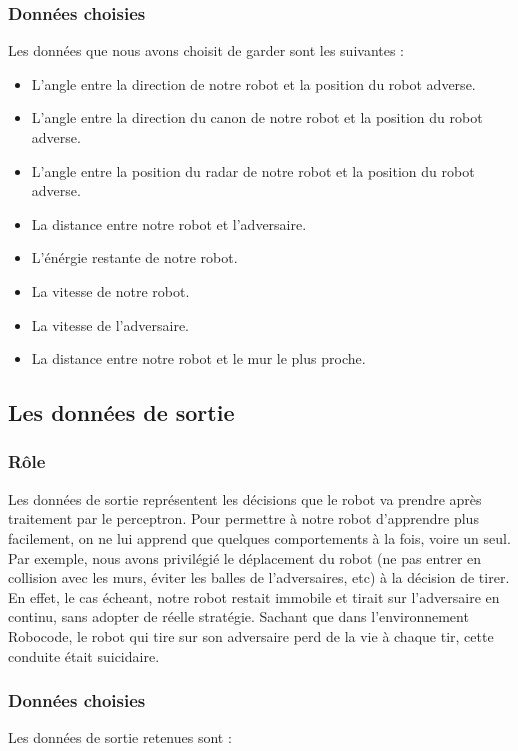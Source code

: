 \documentclass[12pt]{article}
\begin{document}
\subsubsection{Données choisies}
Les données que nous avons choisit de garder sont les suivantes :

\begin{itemize}
\item L'angle entre la direction de notre robot et la position du robot adverse.
\item L'angle entre la direction du canon de notre robot et la position du robot adverse.
\item L'angle entre la position du radar de notre robot et la position du robot adverse.
\item La distance entre notre robot et l'adversaire.
\item L'énérgie restante de notre robot.
\item La vitesse de notre robot.
\item La vitesse de l'adversaire.
\item La distance entre notre robot et le mur le plus proche.
\end{itemize}

\subsection{Les données de sortie}

\subsubsection{Rôle}
Les données de sortie représentent les décisions que le robot va prendre après traitement par le perceptron. Pour permettre à notre robot d'apprendre plus facilement, on ne lui apprend que quelques comportements à la fois, voire un seul. Par exemple, nous avons privilégié le déplacement du robot (ne pas entrer en collision avec les murs, éviter les balles de l'adversaires, etc) à la décision de tirer. En effet, le cas écheant, notre robot restait immobile et tirait sur l'adversaire en continu, sans adopter de réelle stratégie. Sachant que dans l'environnement Robocode, le robot qui tire sur son adversaire perd de la vie à chaque tir, cette conduite était suicidaire.

\subsubsection{Données choisies}
Les données de sortie retenues sont :
\end{document}
